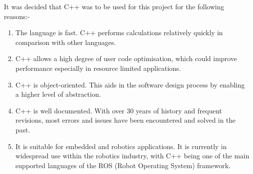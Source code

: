 It was decided that C++ was to be used for this project for the following reasons:-

\begin{enumerate}
	\item The language is fast. C++ performs calculations relatively quickly in comparison with other languages.
	\item C++ allows a high degree of user code optimisation, which could improve performance especially in resource limited applications.
	\item C++ is object-oriented. This aids in the software design process by enabling a higher level of abstraction.
	\item C++ is well documented. With over 30 years of history and frequent revisions, most errors and issues have been encountered and solved in the past.
	\item It is suitable for embedded and robotics applications. It is currently in widespread use within the robotics industry, with C++ being one of the main supported languages of the ROS (Robot Operating System) framework.
\end{enumerate}